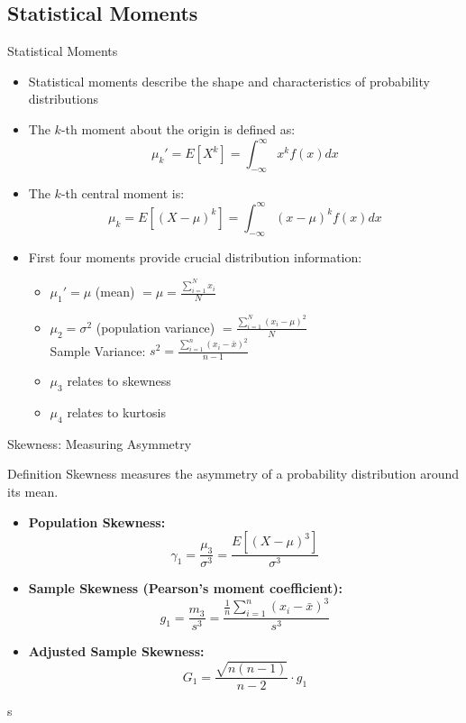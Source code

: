 \documentclass[aspectratio=169,xcolor=dvipsnames,svgnames,x11names,fleqn]{beamer}
\begin{document}
    \subsection{Statistical Moments}

        
    \begin{frame}
    \subsectionpage
    \end{frame}

    \begin{frame}{Statistical Moments}
        \footnotesize

\begin{itemize}
    \item Statistical moments describe the shape and characteristics of probability distributions
    \item The $k$-th moment about the origin is defined as:
    $$\mu_k' = E[X^k] = \int_{-\infty}^{\infty} x^k f(x) dx$$
    \item The $k$-th central moment is:
    $$\mu_k = E[(X - \mu)^k] = \int_{-\infty}^{\infty} (x - \mu)^k f(x) dx$$
    \item First four moments provide crucial distribution information:
    \begin{itemize}
        \item $\mu_1' = \mu$ (mean) $ =  \mu = \frac{\sum_{i=1}^{N} x_i}{N} $
        \item $\mu_2 = \sigma^2$ (population variance)  $ = \frac{\sum_{i=1}^{N}(x_i - \mu)^2}{N}$\\
        
        Sample Variance: $s^2 = \frac{\sum_{i=1}^{n}(x_i - \bar{x})^2}{n-1}$

        \item $\mu_3$ relates to skewness
        \item $\mu_4$ relates to kurtosis
    \end{itemize}
\end{itemize}
\end{frame}

\begin{frame}{Skewness: Measuring Asymmetry}
\begin{block}{Definition}
Skewness measures the asymmetry of a probability distribution around its mean.
\end{block}

\begin{itemize}
    \item \textbf{Population Skewness:}
    $$\gamma_1 = \frac{\mu_3}{\sigma^3} = \frac{E[(X - \mu)^3]}{\sigma^3}$$
    
    \item \textbf{Sample Skewness (Pearson's moment coefficient):}
    $$g_1 = \frac{m_3}{s^3} = \frac{\frac{1}{n}\sum_{i=1}^{n}(x_i - \bar{x})^3}{s^3}$$
    
    \item \textbf{Adjusted Sample Skewness:}
    $$G_1 = \frac{\sqrt{n(n-1)}}{n-2} \cdot g_1$$
\end{itemize}
\end{frame}
s
\end{document}
